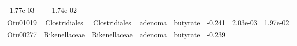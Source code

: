 \documentclass[11pt,]{article}
\begin{document}
\begin{longtable}[]{@{}cccccccc@{}}
\begin{minipage}[t]{0.08\columnwidth}
1.77e-03\strut
\end{minipage} & \begin{minipage}[t]{0.08\columnwidth}\centering\strut
1.74e-02\strut
\end{minipage}\tabularnewline
\begin{minipage}[t]{0.08\columnwidth}\centering\strut
Otu01019\strut
\end{minipage} & \begin{minipage}[t]{0.15\columnwidth}\centering\strut
Clostridiales\strut
\end{minipage} & \begin{minipage}[t]{0.15\columnwidth}\centering\strut
Clostridiales\strut
\end{minipage} & \begin{minipage}[t]{0.08\columnwidth}\centering\strut
adenoma\strut
\end{minipage} & \begin{minipage}[t]{0.09\columnwidth}\centering\strut
butyrate\strut
\end{minipage} & \begin{minipage}[t]{0.07\columnwidth}\centering\strut
-0.241\strut
\end{minipage} & \begin{minipage}[t]{0.08\columnwidth}\centering\strut
2.03e-03\strut
\end{minipage} & \begin{minipage}[t]{0.08\columnwidth}\centering\strut
1.97e-02\strut
\end{minipage}\tabularnewline
\begin{minipage}[t]{0.08\columnwidth}\centering\strut
Otu00277\strut
\end{minipage} & \begin{minipage}[t]{0.15\columnwidth}\centering\strut
Rikenellaceae\strut
\end{minipage} & \begin{minipage}[t]{0.15\columnwidth}\centering\strut
Rikenellaceae\strut
\end{minipage} & \begin{minipage}[t]{0.08\columnwidth}\centering\strut
adenoma\strut
\end{minipage} & \begin{minipage}[t]{0.09\columnwidth}\centering\strut
butyrate\strut
\end{minipage} & \begin{minipage}[t]{0.07\columnwidth}\centering\strut
-0.239\strut
\end{minipage} & \begin{minipage}[t]{0.08\columnwidth}\centering\strut

\end{minipage}
\end{longtable}
\end{document}
